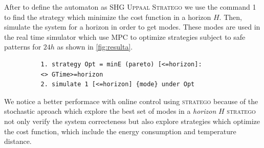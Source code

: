         After to define the automaton as \ac{SHG} \textsc{Uppaal Stratego}
        we use the command 1 to find the strategy which minimize the cost 
        function in a horizon $H$. Then, simulate the system for a horizon
        in order to get modes. These modes are used in the real time 
        simulator which use \ac{MPC} to optimize strategies subject to safe
        patterns for $24h$ as shown in \autoref{fig:resulta}.

        \begin{lstlisting}
          1. strategy Opt = minE (pareto) [<=horizon]: 
          <> GTime>=horizon
          2. simulate 1 [<=horizon] {mode} under Opt
        \end{lstlisting}

        We notice a better performace with online control using \textsc{stratego}
        because  of the stochastic aproach which explore the best set of modes in 
        a \emph{horizon} $H$ \textsc{stratego} not only verify the system correcteness
        but also explore strategies which optimize the cost function, which include
        the energy consumption and temperature distance.
